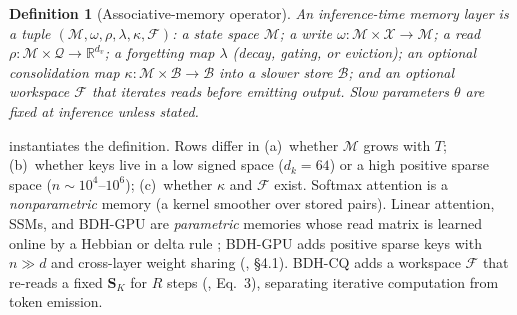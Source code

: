 \documentclass[10pt]{article}
\newtheorem{definition}{Definition}
\theoremstyle{remark}
\newcommand{\R}{\mathbb{R}}
\newcommand{\Sm}{\mathbf{S}}
\begin{document}
\begin{definition}[Associative-memory operator]
\label{def:amo}
An inference-time memory layer is a tuple $(\mathcal{M},\omega,\rho,\lambda,\kappa,\mathcal{F})$: a state space
$\mathcal{M}$; a \emph{write} $\omega:\mathcal{M}\times\mathcal{X}\to\mathcal{M}$; a \emph{read}
$\rho:\mathcal{M}\times\mathcal{Q}\to\R^{d_v}$; a \emph{forgetting} map $\lambda$ (decay, gating, or eviction); an
optional \emph{consolidation} map $\kappa:\mathcal{M}\times\mathcal{B}\to\mathcal{B}$ into a slower store
$\mathcal{B}$; and an optional \emph{workspace} $\mathcal{F}$ that iterates reads before emitting output. Slow
parameters $\theta$ are fixed at inference unless stated.
\end{definition}

 instantiates the definition. Rows differ in (a)~whether $\mathcal{M}$ grows with $T$;
(b)~whether keys live in a low signed space ($d_k=64$) or a high positive sparse space ($n\sim10^4$--$10^6$);
(c)~whether $\kappa$ and $\mathcal{F}$ exist. Softmax attention is a \emph{nonparametric} memory (a kernel smoother
over stored pairs). Linear attention, SSMs, and BDH-GPU are \emph{parametric} memories whose read matrix is learned
online by a Hebbian or delta rule \citep{schlag2021linear}; BDH-GPU adds positive sparse keys with $n\gg d$ and
cross-layer weight sharing (\citealp{kosowski2025bdh}, \S4.1). BDH-CQ adds a workspace $\mathcal{F}$ that re-reads a
fixed $\Sm_K$ for $R$ steps (\citealp{engdahl2026bdhcq}, Eq.~3), separating iterative computation from token emission.
\end{document}
